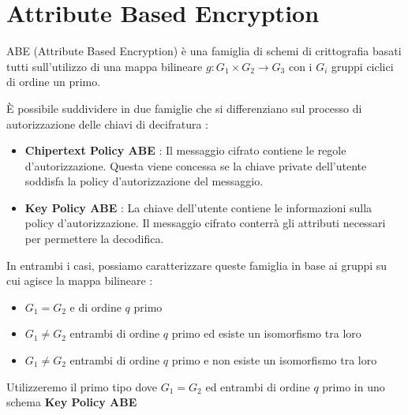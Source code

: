 \chapter{Attribute Based Encryption}

ABE (Attribute Based Encryption) è una famiglia di schemi di crittografia basati tutti sull'utilizzo di una mappa bilineare $g:G_1 \times G_2 \rightarrow G_3$ con i $G_i$ gruppi ciclici di ordine un primo.

È possibile suddividere in due famiglie che si differenziano sul processo di autorizzazione delle chiavi di decifratura :
\begin{itemize}
	\item \textbf{{Chipertext Policy ABE}} :  Il messaggio cifrato contiene le regole d'autorizzazione. Questa viene concessa se la chiave private dell'utente soddisfa la policy d'autorizzazione del messaggio.
	\item \textbf{Key Policy ABE} : La chiave dell'utente contiene le informazioni sulla policy d'autorizzazione. Il messaggio cifrato conterrà gli attributi necessari per permettere la decodifica.
\end{itemize}

In entrambi i casi, possiamo caratterizzare\cite{maya3} queste famiglia in base ai gruppi su cui agisce la mappa bilineare :
\begin{itemize}
	\item $G_1 = G_2$ e di ordine $q$ primo
	\item $G_1 \neq G_2$ entrambi di ordine $q$ primo ed esiste un isomorfismo tra loro
	\item $G_1 \neq G_2$ entrambi di ordine $q$ primo e non esiste un isomorfismo tra loro
\end{itemize}	

Utilizzeremo il primo tipo dove $G_1 = G_2$ ed entrambi di ordine $q$ primo in uno schema \textbf{Key Policy ABE}








